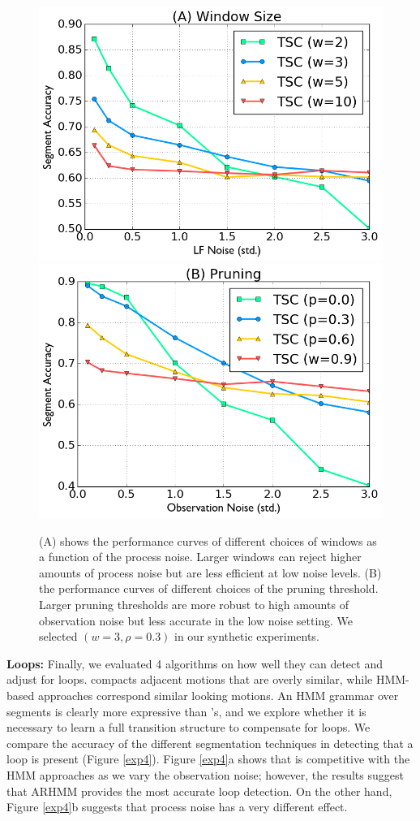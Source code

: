 \begin{figure}[ht!]
\centering
\includegraphics[width=0.48\columnwidth]{tsc-experiments/exp3.png}
\includegraphics[width=0.48\columnwidth]{tsc-experiments/exp4.png}
\caption{(A) shows the performance curves of different choices of windows as a function of the process noise. Larger windows can reject higher amounts of process noise but are less efficient at low noise levels. (B) the performance curves of different choices of the pruning threshold. Larger pruning thresholds are more robust to high amounts of observation noise but less accurate in the low noise setting. We selected $(w=3, \rho=0.3)$ in our synthetic experiments. \label{exp3}}
\end{figure}

\textbf{Loops: }
Finally, we evaluated 4 algorithms on how well they can detect and adjust for loops.
\tsc compacts adjacent motions that are overly similar, while HMM-based approaches correspond similar looking motions.
An HMM grammar over segments is clearly more expressive than \tsc's, and we explore whether it is necessary to learn a full transition structure to compensate for loops.
We compare the accuracy of the different segmentation techniques in detecting that a loop is present (Figure \ref{exp4}).
Figure \ref{exp4}a shows that \tsc is competitive with the HMM approaches as we vary the observation noise; however, the results suggest that ARHMM provides the most accurate loop detection.
On the other hand, Figure \ref{exp4}b suggests that process noise has a very different effect.


